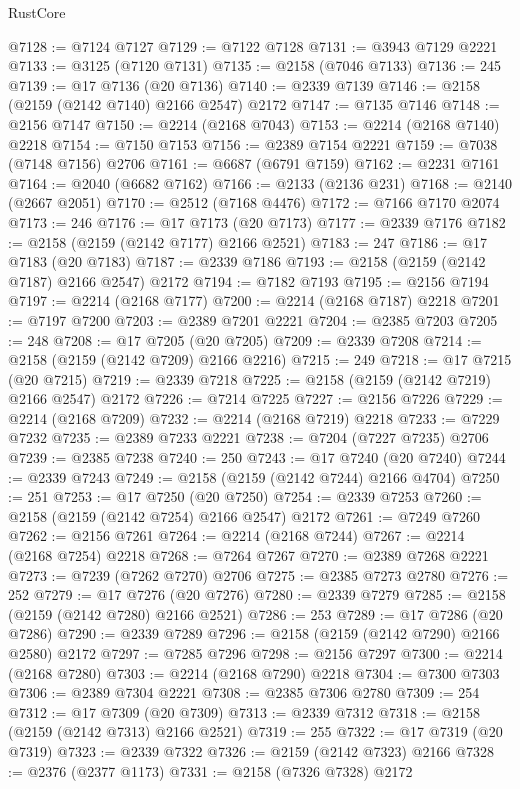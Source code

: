 \begin{lexlean}{RustCore}
\begin{coremodule}
@7128 := @7124 @7127
@7129 := @7122 @7128
@7131 := @3943 @7129 @2221
@7133 := @3125 (@7120 @7131)
@7135 := @2158 (@7046 @7133)
@7136 := 245
@7139 := @17 @7136 (@20 @7136)
@7140 := @2339 @7139
@7146 := @2158 (@2159 (@2142 @7140) @2166 @2547) @2172
@7147 := @7135 @7146
@7148 := @2156 @7147
@7150 := @2214 (@2168 @7043)
@7153 := @2214 (@2168 @7140) @2218
@7154 := @7150 @7153
@7156 := @2389 @7154 @2221
@7159 := @7038 (@7148 @7156) @2706
@7161 := @6687 (@6791 @7159)
@7162 := @2231 @7161
@7164 := @2040 (@6682 @7162)
@7166 := @2133 (@2136 @231)
@7168 := @2140 (@2667 @2051)
@7170 := @2512 (@7168 @4476)
@7172 := @7166 @7170 @2074
@7173 := 246
@7176 := @17 @7173 (@20 @7173)
@7177 := @2339 @7176
@7182 := @2158 (@2159 (@2142 @7177) @2166 @2521)
@7183 := 247
@7186 := @17 @7183 (@20 @7183)
@7187 := @2339 @7186
@7193 := @2158 (@2159 (@2142 @7187) @2166 @2547) @2172
@7194 := @7182 @7193
@7195 := @2156 @7194
@7197 := @2214 (@2168 @7177)
@7200 := @2214 (@2168 @7187) @2218
@7201 := @7197 @7200
@7203 := @2389 @7201 @2221
@7204 := @2385 @7203
@7205 := 248
@7208 := @17 @7205 (@20 @7205)
@7209 := @2339 @7208
@7214 := @2158 (@2159 (@2142 @7209) @2166 @2216)
@7215 := 249
@7218 := @17 @7215 (@20 @7215)
@7219 := @2339 @7218
@7225 := @2158 (@2159 (@2142 @7219) @2166 @2547) @2172
@7226 := @7214 @7225
@7227 := @2156 @7226
@7229 := @2214 (@2168 @7209)
@7232 := @2214 (@2168 @7219) @2218
@7233 := @7229 @7232
@7235 := @2389 @7233 @2221
@7238 := @7204 (@7227 @7235) @2706
@7239 := @2385 @7238
@7240 := 250
@7243 := @17 @7240 (@20 @7240)
@7244 := @2339 @7243
@7249 := @2158 (@2159 (@2142 @7244) @2166 @4704)
@7250 := 251
@7253 := @17 @7250 (@20 @7250)
@7254 := @2339 @7253
@7260 := @2158 (@2159 (@2142 @7254) @2166 @2547) @2172
@7261 := @7249 @7260
@7262 := @2156 @7261
@7264 := @2214 (@2168 @7244)
@7267 := @2214 (@2168 @7254) @2218
@7268 := @7264 @7267
@7270 := @2389 @7268 @2221
@7273 := @7239 (@7262 @7270) @2706
@7275 := @2385 @7273 @2780
@7276 := 252
@7279 := @17 @7276 (@20 @7276)
@7280 := @2339 @7279
@7285 := @2158 (@2159 (@2142 @7280) @2166 @2521)
@7286 := 253
@7289 := @17 @7286 (@20 @7286)
@7290 := @2339 @7289
@7296 := @2158 (@2159 (@2142 @7290) @2166 @2580) @2172
@7297 := @7285 @7296
@7298 := @2156 @7297
@7300 := @2214 (@2168 @7280)
@7303 := @2214 (@2168 @7290) @2218
@7304 := @7300 @7303
@7306 := @2389 @7304 @2221
@7308 := @2385 @7306 @2780
@7309 := 254
@7312 := @17 @7309 (@20 @7309)
@7313 := @2339 @7312
@7318 := @2158 (@2159 (@2142 @7313) @2166 @2521)
@7319 := 255
@7322 := @17 @7319 (@20 @7319)
@7323 := @2339 @7322
@7326 := @2159 (@2142 @7323) @2166
@7328 := @2376 (@2377 @1173)
@7331 := @2158 (@7326 @7328) @2172

\end{coremodule}
\end{lexlean}
